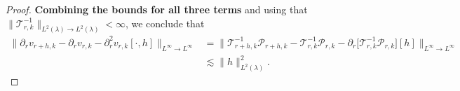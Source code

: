 \documentclass[11pt]{article}
\theoremstyle{plain}
\begin{document}
\begin{proof}
\noindent \textbf{Combining the bounds for all three terms} and using that $ \|\mathcal{T}_{r,k}^{-1}\|_{L^2(\lambda) \to L^2(\lambda)} < \infty$, we conclude that
 \begin{align*}
 \|\partial_{r} v_{r + h,k} - \partial_{r} v_{r,k} - \partial_r^2 v_{r, k}[\cdot, h]  \|_{L^\infty \rightarrow L^\infty}  &= \|\mathcal{T}_{r+ h,k}^{-1}\mathcal{P}_{r+ h,k}
 - \mathcal{T}_{r,k}^{-1}\mathcal{P}_{r,k}
 - \partial_r\!\big[\mathcal{T}_{r,k}^{-1}\mathcal{P}_{r,k}\big][h]\|_{L^\infty \rightarrow L^\infty}\\
 & \lesssim \|h\|_{L^2(\lambda)}^2 .
 \end{align*}

 



\end{proof}
\end{document}
